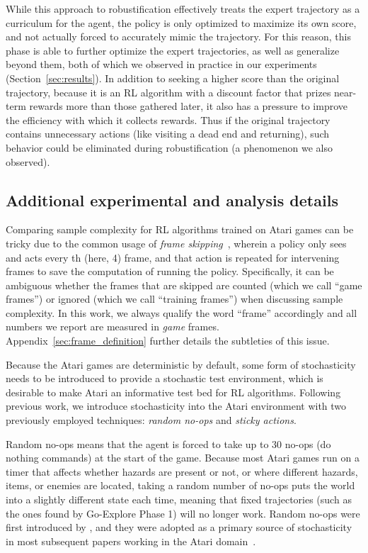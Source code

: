 \documentclass{article}
\begin{document}
While this approach to robustification effectively treats the expert trajectory as a curriculum for the agent, the policy is only optimized to maximize its own score, and not actually forced to accurately mimic the trajectory. For this reason, this phase is able to further optimize the expert trajectories, as well as generalize beyond them, both of which we observed in practice in our experiments (Section~\ref{sec:results}). In addition to seeking a higher score than the original trajectory, because it is an RL algorithm with a discount factor that prizes near-term rewards more than those gathered later, it also has a pressure to improve the efficiency with which it collects rewards. Thus if the original trajectory contains unnecessary actions (like visiting a dead end and returning), such behavior could be eliminated during robustification (a phenomenon we also observed). 


\subsection{Additional experimental and analysis details}
\label{sec:experimental_details}

Comparing sample complexity for RL algorithms trained on Atari games can be tricky due to the common usage of \emph{frame skipping}~\cite{such:arxiv17,Machado2018RevisitingTA}, wherein a policy only sees and acts every th (here, 4) frame, and that action is repeated for intervening frames to save the computation of running the policy. Specifically, it can be ambiguous whether the frames that are skipped are counted (which we call ``game frames'') or ignored (which we call ``training frames'') when discussing sample complexity. In this work, we always qualify the word ``frame'' accordingly and all numbers we report are measured in \emph{game} frames. Appendix~\ref{sec:frame_definition} further details the subtleties of this issue.

Because the Atari games are deterministic by default, some form of stochasticity needs to be introduced to provide a stochastic test environment, which is desirable to make Atari an informative test bed for RL algorithms. Following previous work, we introduce stochasticity into the Atari environment with two previously employed techniques: \emph{random no-ops} and \emph{sticky actions}.

Random no-ops means that the agent is forced to take up to 30 no-ops (do nothing commands) at the start of the game. Because most Atari games run on a timer that affects whether hazards are present or not, or where different hazards, items, or enemies are located, taking a random number of no-ops puts the world into a slightly different state each time, meaning that fixed trajectories (such as the ones found by Go-Explore Phase 1) will no longer work. Random no-ops were first introduced by \citet{mnih:nature15}, and they were adopted as a primary source of stochasticity in most subsequent papers working in the Atari domain~\cite{mnih:nature15,van2016deep,wang2015dueling,schaul2015prioritized,van2016learning,salimans2017evolution,hester2017deep,gruslys2017reactor,Bellemare2017ADP,ODonoghue2018TheUB,Hessel2018RainbowCI,espeholt:impala2018,horgan:apexdqn2018,pohlen2018observe,aytar2018playing}.
\end{document}
